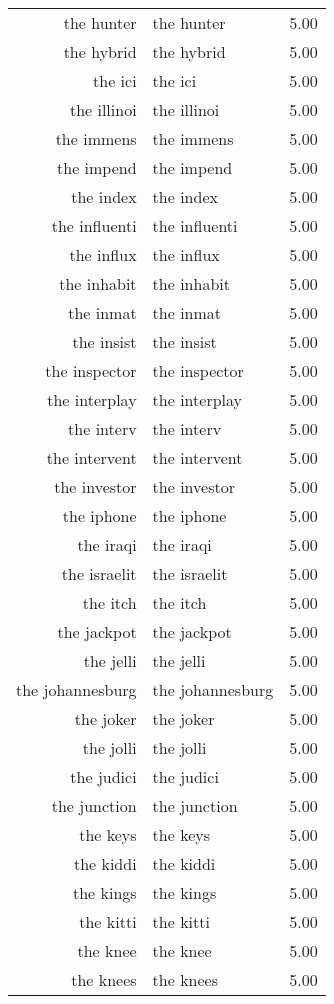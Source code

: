 \begin{table}[ht]
\begin{tabular}{rlr}
  the hunter & the hunter & 5.00 \\ 
  the hybrid & the hybrid & 5.00 \\ 
  the ici & the ici & 5.00 \\ 
  the illinoi & the illinoi & 5.00 \\ 
  the immens & the immens & 5.00 \\ 
  the impend & the impend & 5.00 \\ 
  the index & the index & 5.00 \\ 
  the influenti & the influenti & 5.00 \\ 
  the influx & the influx & 5.00 \\ 
  the inhabit & the inhabit & 5.00 \\ 
  the inmat & the inmat & 5.00 \\ 
  the insist & the insist & 5.00 \\ 
  the inspector & the inspector & 5.00 \\ 
  the interplay & the interplay & 5.00 \\ 
  the interv & the interv & 5.00 \\ 
  the intervent & the intervent & 5.00 \\ 
  the investor & the investor & 5.00 \\ 
  the iphone & the iphone & 5.00 \\ 
  the iraqi & the iraqi & 5.00 \\ 
  the israelit & the israelit & 5.00 \\ 
  the itch & the itch & 5.00 \\ 
  the jackpot & the jackpot & 5.00 \\ 
  the jelli & the jelli & 5.00 \\ 
  the johannesburg & the johannesburg & 5.00 \\ 
  the joker & the joker & 5.00 \\ 
  the jolli & the jolli & 5.00 \\ 
  the judici & the judici & 5.00 \\ 
  the junction & the junction & 5.00 \\ 
  the keys & the keys & 5.00 \\ 
  the kiddi & the kiddi & 5.00 \\ 
  the kings & the kings & 5.00 \\ 
  the kitti & the kitti & 5.00 \\ 
  the knee & the knee & 5.00 \\ 
  the knees & the knees & 5.00 \\ 

\end{tabular}
\end{table}
